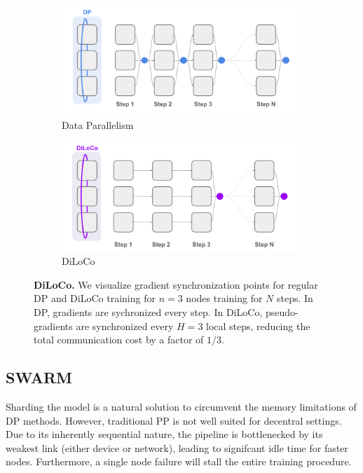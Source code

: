 \documentclass{article}
\begin{document}
\begin{figure}[ht]
    \centering
    \begin{subfigure}[b]{0.45\textwidth}
        \centering
        \includegraphics[width=\textwidth]{figures/dp-over-time.png}
        \caption{Data Parallelism}
    \end{subfigure}
    \hfill
    \begin{subfigure}[b]{0.45\textwidth}
        \centering
        \includegraphics[width=\textwidth]{figures/diloco-over-time.png}
        \caption{DiLoCo}
    \end{subfigure}
    \caption{\textbf{DiLoCo.} We visualize gradient synchronization points for
    regular DP and DiLoCo training for $n=3$ nodes training for $N$ steps. In
    DP, gradients are sychronized every step. In DiLoCo, pseudo-gradients are
    synchronized every $H=3$ local steps, reducing the total communication
    cost by a factor of $1/3$.}
    \label{fig:diloco}
\end{figure}


\subsection{SWARM}


Sharding the model is a natural solution to circumvent the memory limitations of
DP methods. However, traditional PP is not well suited for decentral settings.
Due to its inherently sequential nature, the pipeline is bottlenecked by its
weakest link (either device or network), leading to signifcant idle time for
faster nodes. Furthermore, a single node failure will stall the entire training
procedure.
\end{document}
